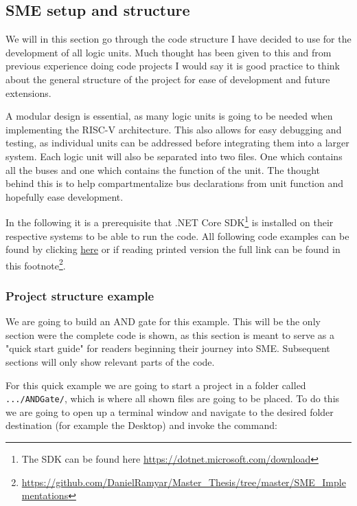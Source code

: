     \subsection{SME setup and structure}
        We will in this section go through the code structure I have decided to use for the development of all logic units. Much thought has been given to this and from previous experience doing code projects I would say it is good practice to think about the general structure of the project for ease of development and future extensions.
        
        A modular design is essential, as many logic units is going to be needed when implementing the RISC-V architecture. This also allows for easy debugging and testing, as individual units can be addressed before integrating them into a larger system. Each logic unit will also be separated into two files. One which contains all the buses and one which contains the function of the unit. The thought behind this is to help compartmentalize bus declarations from unit function and hopefully ease development.  
        
        In the following it is a prerequisite that .NET Core SDK\footnote{The SDK can be found here \url{https://dotnet.microsoft.com/download}} is installed on their respective systems to be able to run the code. All following code examples can be found by clicking \href{https://github.com/DanielRamyar/Master_Thesis/tree/master/SME_Implementations}{here} or if reading printed version the full link can be found in this footnote\footnote{\url{https://github.com/DanielRamyar/Master_Thesis/tree/master/SME_Implementations}}.
        
        \subsubsection{Project structure example}
        We are going to build an AND gate for this example. This will be the only section were the complete code is shown, as this section is meant to serve as a "quick start guide" for readers beginning their journey into SME. Subsequent sections will only show relevant parts of the code. 
        
        For this quick example we are going to start a project in a folder called \texttt{.../ANDGate/}, which is where all shown files are going to be placed.
        To do this we are going to open up a terminal window and navigate to the desired folder destination (for example the Desktop) and invoke the command: 
        
